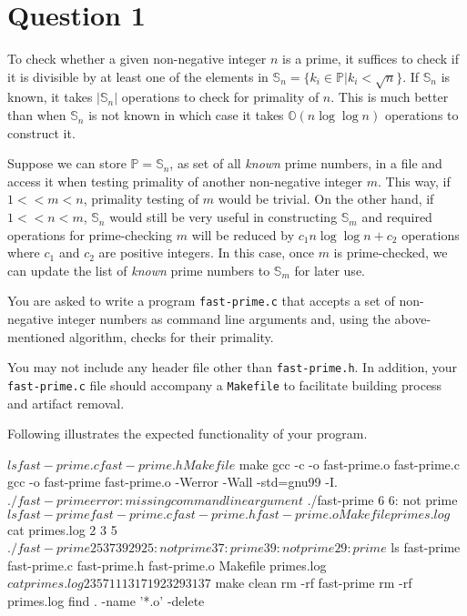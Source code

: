 \documentclass[12pt,letterpaper,twoside]{article}
\begin{document}


\section*{Question 1}

To check whether a given non-negative integer $n$ is a prime, it suffices to check if it is divisible by at least one of the elements in $\mathbb{S}_n =  \{ k_i \in \mathbb{P} | k_i < \sqrt{n} \}$.
If $\mathbb{S}_n$ is known, it takes $|\mathbb{S}_n|$ operations to check for primality of $n$.
This is much better than when $\mathbb{S}_n$ is not known in which case it takes $\mathbb{O}(n \log \log n)$ operations to construct it.

Suppose we can store $\mathbb{P} = \mathbb{S}_n$, as set of all \textit{known} prime numbers, in a file and access it when testing primality of another non-negative integer $m$.
This way, if $1 << m < n$, primality testing of $m$ would be trivial.
On the other hand, if $1 << n < m$, $\mathbb{S}_n$ would still be very useful in constructing $\mathbb{S}_m$ and required operations for prime-checking $m$ will be reduced by $c_1 n \log \log n + c_2$ operations where $c_1$ and $c_2$ are positive integers.
In this case, once $m$ is prime-checked, we can update the list of \textit{known} prime numbers to $\mathbb{S}_m$ for later use.

You are asked to write a program \texttt{fast-prime.c} that accepts a set of non-negative integer numbers as command line arguments and, using the above-mentioned algorithm, checks for their primality.

You may not include any header file other than \texttt{fast-prime.h}.
In addition, your \texttt{fast-prime.c} file should accompany a \texttt{Makefile} to facilitate building process and artifact removal.

Following illustrates the expected functionality of your program.

\newpage

\begin{terminal}
$ ls
fast-prime.c fast-prime.h Makefile
$ make
gcc -c -o fast-prime.o fast-prime.c
gcc -o fast-prime fast-prime.o -Werror -Wall -std=gnu99 -I.
$ ./fast-prime
error: missing command line argument
$ ./fast-prime 6
6: not prime
$ ls
fast-prime fast-prime.c fast-prime.h fast-prime.o
Makefile primes.log
$ cat primes.log
2
3
5
$ ./fast-prime 25 37 39 29
25: not prime
37: prime
39: not prime
29: prime
$ ls
fast-prime fast-prime.c fast-prime.h fast-prime.o Makefile primes.log
$ cat primes.log
2
3
5
7
11
13
17
19
23
29
31
37
$ make clean
rm -rf fast-prime
rm -rf primes.log
find . -name '*.o' -delete
\end{terminal}
\end{document}
